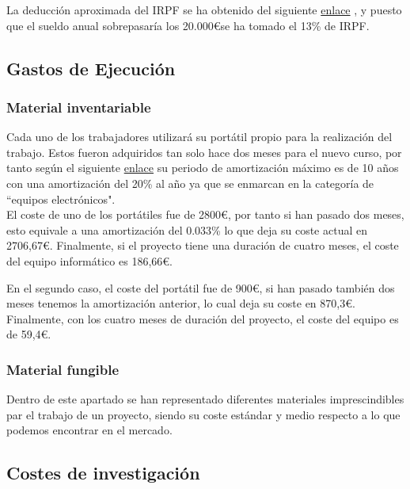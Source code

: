 La deducción aproximada del IRPF se ha obtenido del siguiente \href{https://infoautonomos.eleconomista.es/contratar-trabajadores/calcular-retenciones-IRPF-nominas/}{enlace} \cite{misc:IRPF}, y puesto que el sueldo anual sobrepasaría los 20.000\euro se ha tomado el 13\% de IRPF.

\subsection{Gastos de Ejecución}

\subsubsection{Material inventariable}

Cada uno de los trabajadores utilizará su portátil propio para la realización del trabajo. Estos fueron adquiridos tan solo hace dos meses para el nuevo curso, por tanto según el siguiente \href{https://cuentica.com/asesoria/tabla-anos-y-porcentajes-de-amortizacion-sociedades-a-partir-de-2015/}{enlace} \cite{misc:amortizacion} su periodo de amortización máximo es de 10 años con una amortización del 20\% al año ya que se enmarcan en la categoría de ``equipos electrónicos". \\

El coste de uno de los portátiles fue de  2800\euro, por tanto si han pasado dos meses, esto equivale a una amortización del 0.033\% lo que deja su coste actual en 2706,67\euro. Finalmente, si el proyecto tiene una duración de cuatro meses, el coste del equipo informático es 186,66\euro.

En el segundo caso, el coste del portátil fue de 900\euro, si han pasado también dos meses tenemos la amortización anterior, lo cual deja su coste en 870,3\euro. Finalmente, con los cuatro meses de duración del proyecto, el coste del equipo es de 59,4\euro.

\subsubsection{Material fungible}

Dentro de este apartado se han representado diferentes materiales imprescindibles par el trabajo de un proyecto, siendo su coste estándar y medio respecto a lo que podemos encontrar en el mercado.

\subsection{Costes de investigación}


